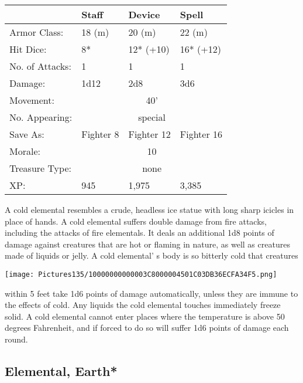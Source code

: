 \documentclass[a4paper,twoside,openany,10pt]{book}
\begin{document}
\begin{multicols}{2}
\begin{tabularx}{0.48\textwidth}{@{}lllX@{}}
& Staff & Device & Spell \\\hline
Armor Class: & 18 (m) & 20 (m) & 22 (m) \\\hline
Hit Dice: & 8* & 12* (+10) & 16* (+12) \\\hline
No. of Attacks: & 1 & 1 & 1 \\\hline
Damage: & 1d12 & 2d8 & 3d6 \\\hline
Movement: & \multicolumn{3}{c}{40'} \\\hline
No. Appearing: &\multicolumn{3}{c}{special} \\\hline
Save As: & Fighter 8 & Fighter 12 & Fighter 16 \\\hline
Morale: & \multicolumn{3}{c}{10} \\\hline
Treasure Type: & \multicolumn{3}{c}{none} \\\hline
XP: & 945 & 1,975 & 3,385 \\\hline
\end{tabularx}\medskip

A cold elemental resembles a crude, headless ice statue with long sharp icicles in place of hands. A cold elemental suffers double damage from fire attacks, including the attacks of fire elementals. It deals an additional 1d8 points of damage against creatures that are hot or flaming in nature, as well as creatures made of liquids or jelly. A cold elemental' s body is so bitterly cold that creatures

\begin{center}
	\texttt{[image: Pictures135/10000000000003C8000004501C03DB36ECFA34F5.png]}
\end{center}

within 5 feet take 1d6 points of damage automatically, unless they are immune to the effects of cold. Any liquids the cold elemental touches immediately freeze solid. A cold elemental cannot enter places where the temperature is above 50 degrees Fahrenheit, and if forced to do so will suffer 1d6 points of damage each round.


\subsection*{Elemental, Earth*}\label{elemental-earth}


\end{multicols}
\end{document}
